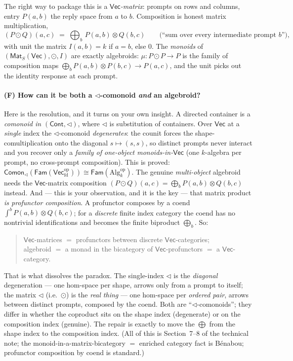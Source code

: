 \documentclass[11pt]{article}
\providecommand{\Vec}{}\renewcommand{\Vec}{\mathsf{Vec}}
\newcommand{\Fam}{\mathsf{Fam}}
\newcommand{\Cont}{\mathsf{Cont}}
\newcommand{\Mat}{\mathsf{Mat}}
\newcommand{\Comon}{\mathsf{Comon}}
\newcommand{\op}{\mathrm{op}}
\newcommand{\fld}{k}
\begin{document}
The right way to package this is a \emph{$\Vec$-matrix}: prompts on rows and columns,
entry $P(a,b)$ the reply space from $a$ to $b$. Composition is honest matrix
multiplication,
\[
  (P \odot Q)(a,c) \;=\; \bigoplus_{b}\, P(a,b)\otimes Q(b,c)
  \qquad\text{(``sum over every intermediate prompt $b$'')},
\]
with unit the matrix $I(a,b)=\fld$ if $a=b$, else $0$. The \emph{monoids} of
$(\Mat_S(\Vec),\odot,I)$ are exactly algebroids: $\mu\colon P\odot P\to P$ is the
family of composition maps $\bigoplus_b P(a,b)\otimes P(b,c)\to P(a,c)$, and the unit
picks out the identity response at each prompt.

\paragraph{(F) How can it be both a $\lhd$-comonoid \emph{and} an algebroid?}
Here is the resolution, and it turns on your own insight. A directed container is a
\emph{comonoid in $(\Cont,\lhd)$}, where $\lhd$ is substitution of containers. Over
$\Vec$ at a \emph{single} index the $\lhd$-comonoid \emph{degenerates}: the counit
forces the shape-comultiplication onto the diagonal $s\mapsto(s,s)$, so distinct
prompts never interact and you recover only a \emph{family of one-object monoids-in-$\Vec$}
(one $\fld$-algebra per prompt, no cross-prompt composition). This is proved:
$\Comon_\lhd(\Fam(\Vec_{\mathrm{fd}}^\op))\cong\Fam(\mathrm{Alg}_\fld^\op)$. The
genuine \emph{multi-object} algebroid needs the $\Vec$-matrix composition
$(P\odot Q)(a,c)=\bigoplus_b P(a,b)\otimes Q(b,c)$ instead. And --- this is your
observation, and it is the key --- that matrix product \emph{is profunctor
composition}. A profunctor composes by a coend $\int^b P(a,b)\otimes Q(b,c)$; for a
\emph{discrete} finite index category the coend has no nontrivial identifications and
becomes the finite biproduct $\bigoplus_b$. So:
\begin{quote}
$\Vec$-matrices $=$ profunctors between discrete $\Vec$-categories;\\
algebroid $=$ a monad in the bicategory of $\Vec$-profunctors $=$ a $\Vec$-category.
\end{quote}
That is what dissolves the paradox. The single-index $\lhd$ is the \emph{diagonal}
degeneration --- one hom-space per shape, arrows only from a prompt to itself; the
matrix $\lhd$ (i.e.\ $\odot$) is the \emph{real thing} --- one hom-space per
\emph{ordered pair}, arrows between distinct prompts, composed by the coend. Both are
``$\lhd$-comonoids''; they differ in whether the coproduct sits on the shape index
(degenerate) or on the composition index (genuine). The repair is exactly to move the
$\bigoplus$ from the shape index to the composition index. (All of this is
Section~7--8 of the technical note; the monoid-in-a-matrix-bicategory $=$ enriched
category fact is B\'enabou; profunctor composition by coend is standard.)
\end{document}
